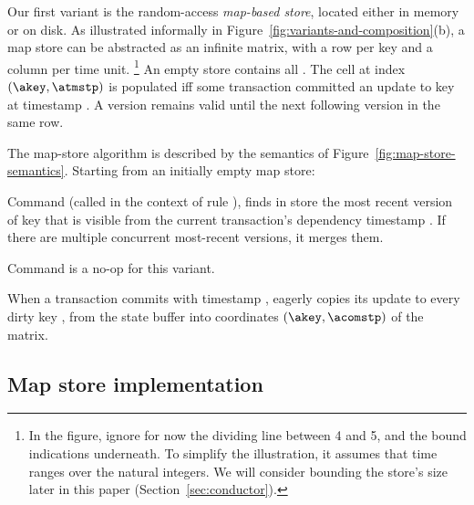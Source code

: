 Our first variant is the random-access \emph{map-based store}, located
either in memory or on disk.
As illustrated informally in
Figure~\ref{fig:variants-and-composition}(b), a map store can be abstracted
as an infinite matrix, with a row per key and a column per time unit.%
%
\footnote{
  In the figure, ignore for now the dividing line between 4 and 5, and
  the bound indications underneath.
  To simplify the illustration, it assumes that time ranges over the
  natural integers.
  We will consider bounding the store's size later in this paper
  (Section~\ref{sec:conductor}).
}
%
An empty store contains all \bottom{}.
The cell at index $(\akey,\atmstp)$ is populated iff some transaction
committed an update to key \akey{} at timestamp \atmstp{}.
A version remains valid until the next following version in the same
\akey{} row.

The map-store algorithm is described by the semantics of
Figure~\ref{fig:map-store-semantics}.
Starting from an initially empty map store:
\begin{compactitem}
\item 
  Command \cmdLookup{\astore}{\akey}{\asnpsht} (called in the context of
  rule \initkeyrule{}), finds in store \astore{} the most recent version
  of key \akey{} that is visible from the current transaction's dependency
  timestamp \asnpsht{}.
  If there are multiple concurrent most-recent versions, it merges them.
\item
  Command \doUpdate is a no-op for this
  variant.
\item
  When a transaction commits with timestamp \acomstp{}, \doCommit{}
  eagerly copies its update to every dirty key \akey{}, from the state
  buffer into coordinates $(\akey, \acomstp)$ of the matrix.
\end{compactitem}

\subsection{Map store implementation}
\label{sec:map-based}

